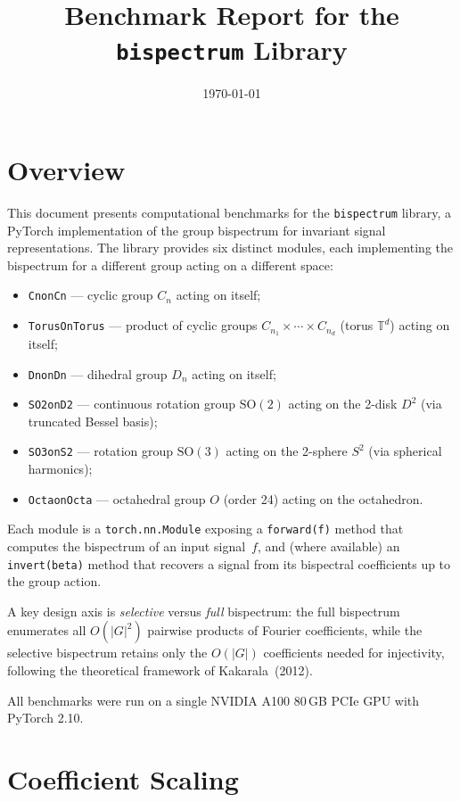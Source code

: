 \documentclass[11pt]{article}
\title{Benchmark Report for the \texttt{bispectrum} Library}
\author{}
\date{\today}
\begin{document}
\maketitle

\section{Overview}

This document presents computational benchmarks for the \texttt{bispectrum}
library, a PyTorch implementation of the group bispectrum for invariant signal
representations.
The library provides six distinct modules, each implementing the bispectrum for
a different group acting on a different space:
\begin{itemize}
    \item \texttt{CnonCn} --- cyclic group $C_n$ acting on itself;
    \item \texttt{TorusOnTorus} --- product of cyclic groups
          $C_{n_1} \times \cdots \times C_{n_d}$ (torus $\mathbb{T}^d$)
          acting on itself;
    \item \texttt{DnonDn} --- dihedral group $D_n$ acting on itself;
    \item \texttt{SO2onD2} --- continuous rotation group $\mathrm{SO}(2)$
          acting on the 2-disk $D^2$ (via truncated Bessel basis);
    \item \texttt{SO3onS2} --- rotation group $\mathrm{SO}(3)$ acting on
          the 2-sphere $S^2$ (via spherical harmonics);
    \item \texttt{OctaonOcta} --- octahedral group $O$ (order 24) acting
          on the octahedron.
\end{itemize}

Each module is a \texttt{torch.nn.Module} exposing a \texttt{forward(f)}
method that computes the bispectrum of an input signal~$f$, and (where
available) an \texttt{invert(beta)} method that recovers a signal from its
bispectral coefficients up to the group action.

A key design axis is \emph{selective} versus \emph{full} bispectrum: the full
bispectrum enumerates all $O(|G|^2)$ pairwise products of Fourier
coefficients, while the selective bispectrum retains only the $O(|G|)$
coefficients needed for injectivity, following the theoretical framework of
Kakarala~(2012).

All benchmarks were run on a single NVIDIA A100 80\,GB PCIe GPU with PyTorch
2.10.

\section{Coefficient Scaling}
\end{document}
